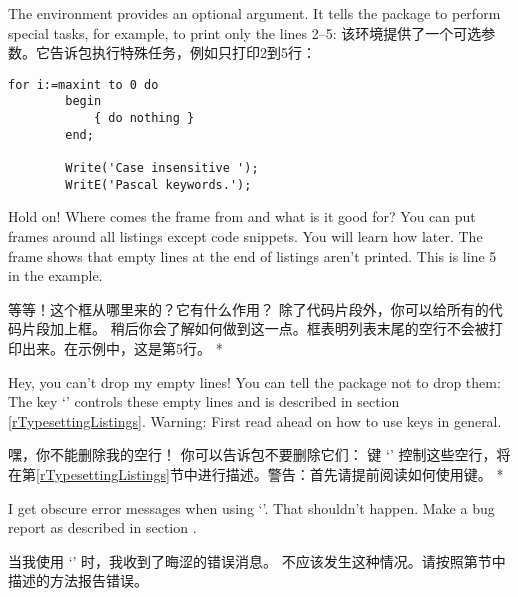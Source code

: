 \begin{paracol}{2}
The environment provides an optional argument. It tells the package to
perform special tasks, for example, to print only the lines 2--5:
\switchcolumn
该环境提供了一个可选参数。它告诉包执行特殊任务，例如只打印2到5行：
\begin{lstsample}{\lstset{frame=trbl,framesep=0pt}\label{gFirstKey=ValueList}}{}
        \begin{lstlisting}[firstline=2,
                            lastline=5]
        for i:=maxint to 0 do
        begin
            { do nothing }
        end;

        Write('Case insensitive ');
        WritE('Pascal keywords.');
        \end{lstlisting}
\end{lstsample}
\end{paracol}


\begin{advise}
    \begin{paracol}{2}
\item Hold on! Where comes the frame from and what is it good for?
\advisespace
You can put frames around all listings except code snippets.
You will learn how later. The frame shows that empty lines at the end
of listings aren't printed. This is line 5 in the example.
\switchcolumn
\item 等等！这个框从哪里来的？它有什么作用？
\advisespace
除了代码片段外，你可以给所有的代码片段加上框。
稍后你会了解如何做到这一点。框表明列表末尾的空行不会被打印出来。在示例中，这是第5行。
\switchcolumn[0]*
\item Hey, you can't drop my empty lines!
\advisespace
You can tell the package not to drop them:
The key `' controls these empty lines and is
described in section \ref{rTypesettingListings}. Warning: First
read ahead on how to use keys in general.
\switchcolumn
\item 嘿，你不能删除我的空行！
\advisespace
你可以告诉包不要删除它们：
键 `' 控制这些空行，将在第\ref{rTypesettingListings}节中进行描述。警告：首先请提前阅读如何使用键。
\switchcolumn[0]*      
\item I get obscure error messages when using `'.
\advisespace
That shouldn't happen. Make a bug report as described in section
.
\switchcolumn      
\item 当我使用 `' 时，我收到了晦涩的错误消息。
\advisespace
不应该发生这种情况。请按照第节中描述的方法报告错误。
\end{paracol}
\end{advise}

